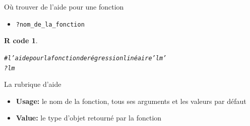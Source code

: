 \documentclass[11pt]{beamer}\usepackage[]{graphicx}\usepackage[]{color}
\makeatletter
\newcommand{\hlcom}[1]{\textcolor[rgb]{0.588,0.588,0.588}{#1}}%
\newcommand{\hlopt}[1]{\textcolor[rgb]{0.196,0.196,0.196}{#1}}%
\newcommand{\hlstd}[1]{\textcolor[rgb]{0.196,0.196,0.196}{#1}}%
\newenvironment{kframe}{%
 \def\at@end@of@kframe{}%
 \ifinner\ifhmode%
  \def\at@end@of@kframe{\end{minipage}}%
  \begin{minipage}{\columnwidth}%
 \fi\fi%
 \def\FrameCommand##1{\hskip\@totalleftmargin \hskip-\fboxsep
 \colorbox{shadecolor}{##1}\hskip-\fboxsep
     \hskip-\linewidth \hskip-\@totalleftmargin \hskip\columnwidth}%
 \MakeFramed {\advance\hsize-\width
   \@totalleftmargin\z@ \linewidth\hsize
   \@setminipage}}%
 {\par\unskip\endMakeFramed%
 \at@end@of@kframe}
\newenvironment{knitrout}{}{} %
\newtheorem{rcode}{R code}[section]
\newcommand{\code}[1]{\texttt{#1}}
\makeatother
\begin{document}
\begin{frame}[fragile]{O\`{u} trouver de l'aide pour une fonction}
\begin{itemize}
  \setlength\itemsep{2em}
\item \mbox{\texttt{?nom\_de\_la\_fonction}}
\end{itemize}

\pause 
\begin{knitrout}
\color{fgcolor}\begin{kframe}
\begin{rcode}\label{unnamed-chunk-2}\begin{alltt}
\hlcom{# l'aide pour la fonction de régression linéaire 'lm'}
\hlopt{?}\hlstd{lm}
\end{alltt}
\end{rcode}\end{kframe}
\end{knitrout}
\end{frame}


\begin{frame}{La rubrique d'aide}
\begin{itemize}
  \setlength\itemsep{2em}
\item \textbf{Usage:} le nom de la fonction, tous ses arguments et les valeurs par défaut
\pause \item \textbf{Value:} le type d'objet retourné par la fonction
\end{itemize}
\end{frame}


\end{document}
